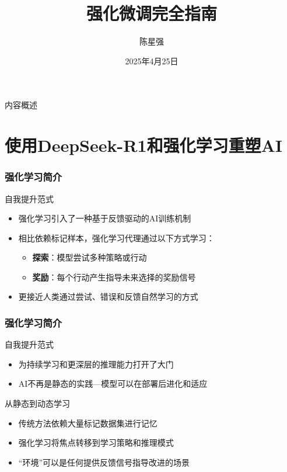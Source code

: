 \documentclass[aspectratio=169]{beamer}
\title[强化微调指南 2025]{强化微调完全指南}
\author{陈星强}
\institute[亿铸智能]{
	亿铸智能
    \\
	中国杭州
}
\date[2025-04-25]{2025年4月25日}
\begin{document}
\begin{frame}
	\maketitle
\end{frame}

\begin{frame}[label=inhalt]{内容概述}
	\tableofcontents
\end{frame}

\section{使用DeepSeek-R1和强化学习重塑AI}

\begin{frame}
	\frametitle{强化学习简介}
	\begin{block}{自我提升范式}
		\begin{itemize}
			\item 强化学习引入了一种基于反馈驱动的AI训练机制
			\item 相比依赖标记样本，强化学习代理通过以下方式学习：
			\begin{itemize}
				\item \textbf{探索}：模型尝试多种策略或行动
				\item \textbf{奖励}：每个行动产生指导未来选择的奖励信号
			\end{itemize}
			\item 更接近人类通过尝试、错误和反馈自然学习的方式
		\end{itemize}
	\end{block}
\end{frame}

\begin{frame}
	\frametitle{强化学习简介 }
	\begin{block}{自我提升范式}
		\begin{itemize}
			\item 为持续学习和更深层的推理能力打开了大门
			\item AI不再是静态的实践—模型可以在部署后进化和适应
		\end{itemize}
	\end{block}
	\begin{block}{从静态到动态学习}
		\begin{itemize}
			\item 传统方法依赖大量标记数据集进行记忆
			\item 强化学习将焦点转移到学习策略和推理模式
			\item “环境”可以是任何提供反馈信号指导改进的场景
		\end{itemize}
	\end{block}
\end{frame}
\end{document}
